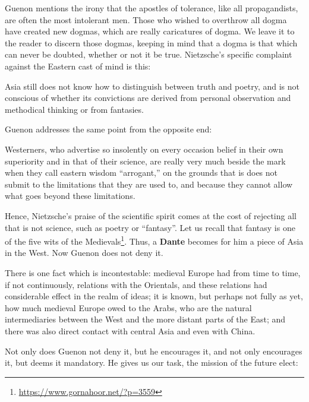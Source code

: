 Guenon mentions the irony that the apostles of tolerance, like all propagandists, are often the most intolerant men. Those who wished to overthrow all dogma have created new dogmas, which are really caricatures of dogma. We leave it to the reader to discern those dogmas, keeping in mind that a dogma is that which can never be doubted, whether or not it be true. Nietzsche's specific complaint against the Eastern cast of mind is this:

\begin{quotex}
Asia still does not know how to distinguish between truth and poetry, and is not conscious of whether its convictions are derived from personal observation and methodical thinking or from fantasies.
\end{quotex}


Guenon addresses the same point from the opposite end:

\begin{quotex}
Westerners, who advertise so insolently on every occasion belief in their own superiority and in that of their science, are really very much beside the mark when they call eastern wisdom ``arrogant,'' on the grounds that is does not submit to the limitations that they are used to, and because they cannot allow what goes beyond these limitations.
\end{quotex}


Hence, Nietzsche's praise of the scientific spirit comes at the cost of rejecting all that is not science, such as poetry or ``fantasy''. Let us recall that fantasy is one of the five wits of the Medievals\footnote{\url{https://www.gornahoor.net/?p=3559}}. Thus, a \textbf{Dante} becomes for him a piece of Asia in the West. Now Guenon does not deny it.

\begin{quotex}
There is one fact which is incontestable: medieval Europe had from time to time, if not continuously, relations with the Orientals, and these relations had considerable effect in the realm of ideas; it is known, but perhaps not fully as yet, how much medieval Europe owed to the Arabs, who are the natural intermediaries between the West and the more distant parts of the East; and there was also direct contact with central Asia and even with China.
\end{quotex}


Not only does Guenon not deny it, but he encourages it, and not only encourages it, but deems it mandatory. He gives us our task, the mission of the future elect:

